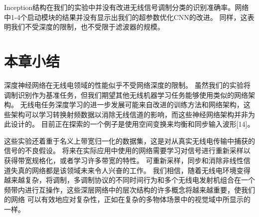 Inception结构在我们的实验中并没有改进无线信号调制分类的识别准确率。网络中1-4个启动模块的结果并没有显示出我们的超参数优化CNN的改进。 同样，这表明我们不受深度的限制，也不受限于滤波器的规模。\par

\section{本章小结}
深度神经网络在无线电领域的性能似乎不受网络深度的限制。 虽然我们的实验将调制识别作为基准任务，但我们期望其他无线机器学习任务能够使用类似的网络架构。 无线电任务深度学习的进一步发展可能来自改进的训练方法和网络架构，这些架构可以学习转换射频数据以消除无线信道的影响，而这些神经网络架构并非为此设计的。 目前正在探索的一个例子是使用空间变换来均衡和同步输入波形[14]。\par

这些实验还着重于名义上带宽归一化的数据集，这是对从真实无线电传输中捕获的信号的不良假设。 将来在实际应用中使用的网络需要学习对信号进行重新采样以获得带宽规格化，或者学习许多带宽的特性。 可重新采样，同步和消除非线性信道失真的网络都是该领域未来令人兴奋的工作。 我们相信，随着无线电环境变得越来越复杂，将调制，多调制协议的不同时间行为和多个无线电发射机组合在一个频带内进行互操作，这些深层网络中的层次结构的许多概念将越来越重要，使我们的网络 可以有效地应对复杂性，正如在复杂的多物体场景中的视觉域中所显示的一样。\par